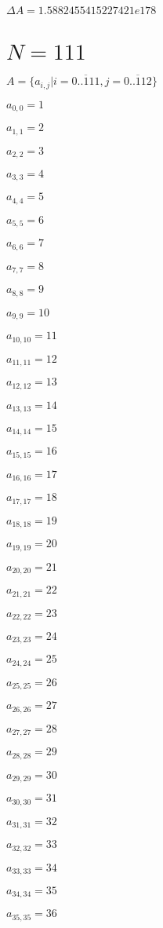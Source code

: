 \documentclass[a4paper,12pt]{article}
\begin{document}
$\Delta A = 1.5882455415227421e178$



\section{ $N = 111$ }
$A = \{ a _{ i, j } | i = \overline { 0..111 }, j = \overline { 0..112 } \}$

$a _{ 0, 0 } = 1$

$a _{ 1, 1 } = 2$

$a _{ 2, 2 } = 3$

$a _{ 3, 3 } = 4$

$a _{ 4, 4 } = 5$

$a _{ 5, 5 } = 6$

$a _{ 6, 6 } = 7$

$a _{ 7, 7 } = 8$

$a _{ 8, 8 } = 9$

$a _{ 9, 9 } = 10$

$a _{ 10, 10 } = 11$

$a _{ 11, 11 } = 12$

$a _{ 12, 12 } = 13$

$a _{ 13, 13 } = 14$

$a _{ 14, 14 } = 15$

$a _{ 15, 15 } = 16$

$a _{ 16, 16 } = 17$

$a _{ 17, 17 } = 18$

$a _{ 18, 18 } = 19$

$a _{ 19, 19 } = 20$

$a _{ 20, 20 } = 21$

$a _{ 21, 21 } = 22$

$a _{ 22, 22 } = 23$

$a _{ 23, 23 } = 24$

$a _{ 24, 24 } = 25$

$a _{ 25, 25 } = 26$

$a _{ 26, 26 } = 27$

$a _{ 27, 27 } = 28$

$a _{ 28, 28 } = 29$

$a _{ 29, 29 } = 30$

$a _{ 30, 30 } = 31$

$a _{ 31, 31 } = 32$

$a _{ 32, 32 } = 33$

$a _{ 33, 33 } = 34$

$a _{ 34, 34 } = 35$

$a _{ 35, 35 } = 36$
\end{document}

